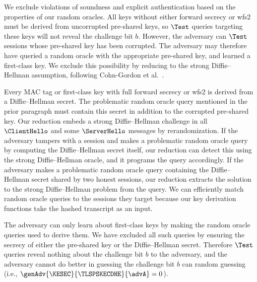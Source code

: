 We exclude violations of soundness and explicit authentication based on the properties of our random oracles.
All keys without either forward secrecy or wfs2 must be derived from uncorrupted pre-shared keys, so $\Test$ queries targeting these keys will not reveal the challenge bit $b$.
%
However, the adversary can $\Test$ sessions whose pre-shared key has been corrupted.
The adversary may therefore have queried a random oracle with the appropriate pre-shared key, and learned a first-class key.
We exclude this possibility by reducing to the strong Diffie--Hellman assumption, following Cohn-Gordon et al.~\cite{C:CCGJJ19}.

Every MAC tag or first-class key with full forward secrecy or wfs2 is derived from a Diffie--Hellman secret.
The problematic random oracle query mentioned in the prior paragraph must contain this secret in addition to the corrupted pre-shared key.
Our reduction embeds a strong Diffie--Hellman challenge in all $\ClientHello$ and some $\ServerHello$ messages by rerandomization.
If the adversary tampers with a session and makes a problematic random oracle query by computing the Diffie--Hellman secret itself, our reduction can detect this using the strong Diffie--Hellman oracle, and it programs the query accordingly.
If the adversary makes a problematic random oracle query containing the Diffie--Hellman secret shared by two honest sessions, our reduction extracts the solution to the strong Diffie--Hellman problem from the query. 
We can efficiently match random oracle queries to the sessions they target because our key derivation functions take the hashed transcript as an input.

The adversary can only learn about first-class keys by making the random oracle queries used to derive them.
We have excluded all such queries by ensuring the secrecy of either the pre-shared key or the Diffie--Hellman secret. 
Therefore $\Test$ queries reveal nothing about the challenge bit $b$ to the adversary, and the adversary cannot do better in guessing the challenge bit $b$ can random guessing (i.e., $\genAdv{\KESEC}{\TLSPSKECDHE}{\advA} = 0$).

